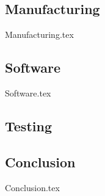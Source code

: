 \subsection{Manufacturing}\label{sec:v1.1-manufacturing}
    {Manufacturing.tex}

\subsection{Software}\label{sec:v1.1-software}
    {Software.tex}

\subsection{Testing}\label{sec:v1.1-testing}




\subsection{Conclusion}\label{sec:v1.1-conclusion}
    {Conclusion.tex}